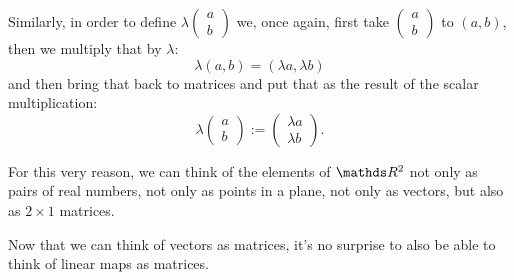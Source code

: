 Similarly, in order to define $\lambda\begin{pmatrix}
a\\b
\end{pmatrix}$ we, once again, first take $\begin{pmatrix}
a\\b
\end{pmatrix}$ to $(a,b)$, then we multiply that by $\lambda$:
\[\lambda(a,b)=(\lambda a,\lambda b)\]and then bring that back to matrices and put that as the result of the scalar multiplication:
\[\lambda\begin{pmatrix}
a\\b
\end{pmatrix}:=\begin{pmatrix}
\lambda a\\\lambda b
\end{pmatrix}.\]

For this very reason, we can think of the elements of $\R^2$ not only as pairs of real numbers, not only as points in a plane, not only as vectors, but also as $2\times 1$ matrices.

\bigskip
Now that we can think of vectors as matrices, it's no surprise to also be able to think of linear maps as matrices.

